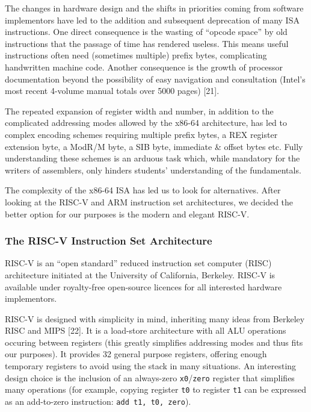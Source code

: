 \documentclass[a4paper,12pt,final]{article}
\makeatletter
\newcommand{\citeprocitem}[2]{\hyper@linkstart{cite}{citeproc_bib_item_#1}#2\hyper@linkend}
\makeatother
\begin{document}
The changes in hardware design and the shifts in priorities coming
from software implementors have led to the addition and subsequent
deprecation of many ISA instructions.  One direct consequence is the
wasting of ``opcode space'' by old instructions that the passage of
time has rendered useless.  This means useful instructions often need
(sometimes multiple) prefix bytes, complicating handwritten machine
code.  Another consequence is the growth of processor documentation
beyond the possibility of easy navigation and consultation (Intel's
most recent 4-volume manual totals over 5000 pages)
\citeprocitem{21}{[21]}.

The repeated expansion of register width and number, in addition to
the complicated addressing modes allowed by the x86-64 architecture,
has led to complex encoding schemes requiring multiple prefix bytes, a
REX register extension byte, a ModR/M byte, a SIB byte, immediate \&
offset bytes etc.  Fully understanding these schemes is an arduous
task which, while mandatory for the writers of assemblers, only
hinders students' understanding of the fundamentals.

The complexity of the x86-64 ISA has led us to look for
alternatives. After looking at the RISC-V and ARM instruction set
architectures, we decided the better option for our purposes is the
modern and elegant RISC-V.

\subsubsection{The RISC-V Instruction Set Architecture}
\label{sec:orge666507}

RISC-V is an ``open standard'' reduced instruction set computer (RISC)
architecture initiated at the University of California, Berkeley.
RISC-V is available under royalty-free open-source licences for all
interested hardware implementors.

RISC-V is designed with simplicity in mind, inheriting many ideas from
Berkeley RISC and MIPS \citeprocitem{22}{[22]}.  It is a load-store
architecture with all ALU operations occuring between registers (this
greatly simplifies addressing modes and thus fits our purposes).  It
provides 32 general purpose registers, offering enough temporary
registers to avoid using the stack in many situations.  An interesting
design choice is the inclusion of an always-zero \texttt{x0}​/​\texttt{zero} register
that simplifies many operations (for example, copying register \texttt{t0} to
register \texttt{t1} can be expressed as an add-to-zero instruction: \texttt{add t1,
t0, zero}).
\end{document}
